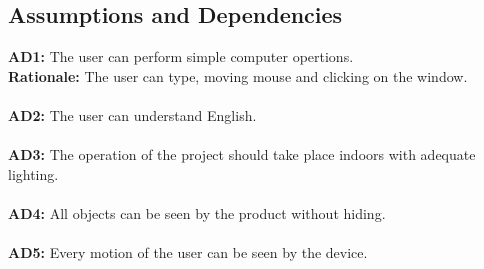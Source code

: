 \documentclass[12pt]{article}
\begin{document}
\subsection{Assumptions and Dependencies}
\textbf{AD1:} The user can perform simple computer opertions.\\
\textbf{Rationale:} The user can type, moving mouse and clicking on the window.\\\\
\textbf{AD2:} The user can understand English.\\\\
\textbf{AD3:} The operation of the project should take place indoors with adequate lighting.\\\\
\textbf{AD4:} All objects can be seen by the product without hiding.\\\\
\textbf{AD5:} Every motion of the user can be seen by the device. 
\end{document}
